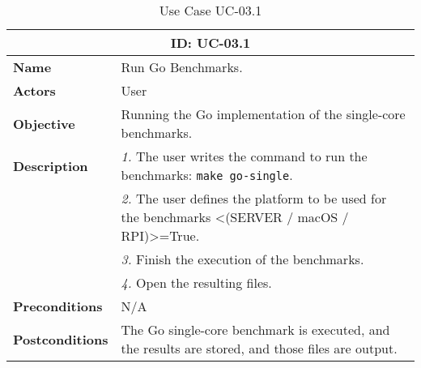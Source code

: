 \begin{table}[H]
    \centering
    \begin{tabular}{l p{10cm}}
        \toprule
        \multicolumn{2}{c}{\textbf{ID: UC-03.1}} \\
        \toprule
        \textbf{Name}                         &  Run Go Benchmarks. \\
        \textbf{Actors}                       &  User \\
        \textbf{Objective}                    &  Running the Go implementation of the single-core benchmarks. \\
        \multirow{1}{*}{\textbf{Description}} & \textsl{1.} The user writes the command to run the benchmarks: \texttt{make go-single}.\\
                                              & \textsl{2.} The user defines the platform to be used for the benchmarks <(SERVER / macOS / RPI)>=True.\\
                                              & \textsl{3.} Finish the execution of the benchmarks.\\
                                              & \textsl{4.} Open the resulting files.\\ 
        \textbf{Preconditions}                &  N/A \\
        \textbf{Postconditions}               &  The Go single-core benchmark is executed, and the results are stored, and those files are output. \\
    \end{tabular}
    \caption{Use Case UC-03.1}
    \label{tab:uc-03.1}
\end{table}

